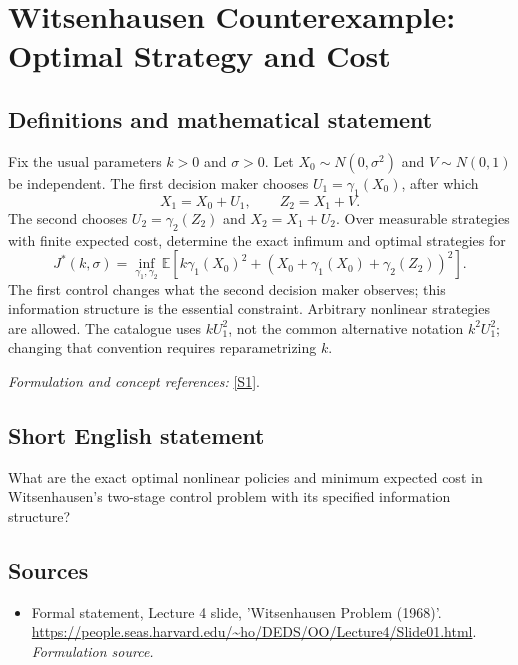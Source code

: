 \documentclass[11pt]{article}
\begin{document}
\section*{\texorpdfstring{Witsenhausen Counterexample: Optimal Strategy and Cost}{Witsenhausen Counterexample: Optimal Strategy and Cost}}\label{488}
\subsection{Definitions and mathematical statement}
Fix the usual parameters $k>0$ and $\sigma>0$. Let $X_0\sim N(0,\sigma^2)$ and $V\sim N(0,1)$ be independent. The first decision maker chooses $U_1=\gamma_1(X_0)$, after which
\[
 X_1=X_0+U_1,\qquad Z_2=X_1+V.
\]
The second chooses $U_2=\gamma_2(Z_2)$ and $X_2=X_1+U_2$. Over measurable strategies with finite expected cost, determine the exact infimum and optimal strategies for
\[
 J^*(k,\sigma)=\inf_{\gamma_1,\gamma_2}
 {\mathbb{E}}\left[k\gamma_1(X_0)^2+
       (X_0+\gamma_1(X_0)+\gamma_2(Z_2))^2\right].
\]
The first control changes what the second decision maker observes; this information structure is the essential constraint. Arbitrary nonlinear strategies are allowed. The catalogue uses $kU_1^2$, not the common alternative notation $k^2U_1^2$; changing that convention requires reparametrizing $k$.
\par\smallskip\textit{Formulation and concept references:} \href{https://people.seas.harvard.edu/~ho/DEDS/OO/Lecture4/Slide01.html}{[S1]}.

\subsection{Short English statement}
What are the exact optimal nonlinear policies and minimum expected cost in Witsenhausen's two-stage control problem with its specified information structure?
\subsection{Sources}
\begin{itemize}
\item[S1]Formal statement, Lecture 4 slide, 'Witsenhausen Problem (1968)'.
\url{https://people.seas.harvard.edu/~ho/DEDS/OO/Lecture4/Slide01.html}.
\textit{Formulation source.}
\end{itemize}
\end{document}
